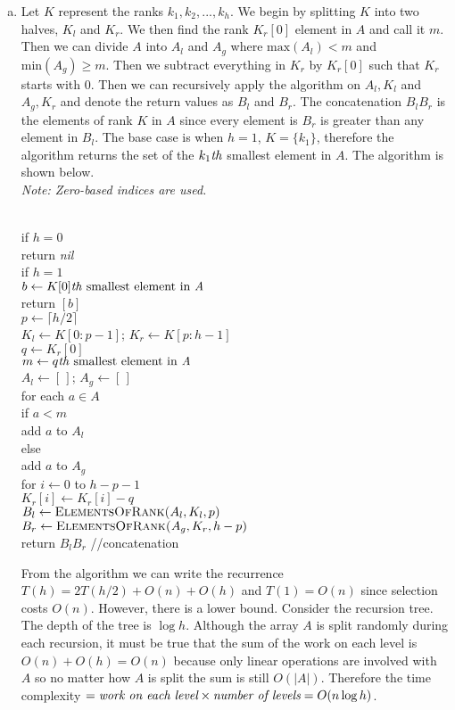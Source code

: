 \documentclass[11pt]{article}
\begin{document}
\begin{solution}
\begin{enumerate}[(a)]
\item
Let $K$ represent the ranks $k_1, k_2, ..., k_h$. We begin by splitting $K$ into two halves, $K_l$ and $K_r$. We then find the rank $K_r[0]$ element in $A$ and call it $m$. Then we can divide $A$ into $A_l$ and $A_g$ where $\text{max}(A_l)<m$ and $\text{min}(A_g)\geq m$. Then we subtract everything in $K_r$ by $K_r[0]$ such that $K_r$ starts with $0$. Then we can recursively apply the algorithm on $A_l, K_l$ and $A_g, K_r$ and denote the return values as $B_l$ and $B_r$. The concatenation $B_lB_r$ is the elements of rank $K$ in $A$ since every element is $B_r$ is greater than any element in $B_l$. The base case is when $h=1$, $K=\{k_1\}$, therefore the algorithm returns the set of the $k_1\text{\emph{th}}$ smallest element in $A$. The algorithm is shown below.\\
\emph{Note: Zero-based indices are used.}
\begin{algo}
	\+
\\	if $h=0$\+
\\	return \emph{nil}\-
\\	if $h=1$\+
\\	$b\gets \text{$K[0]$\emph{th} smallest element in \emph{A}}$
\\	return $[b]$\-
\\	$p\gets \lceil h/2 \rceil$
\\	$K_l\gets K[0:p-1]$; $K_r\gets K[p:h-1]$
\\	$q\gets K_r[0]$
\\	$m\gets \text{$q$\emph{th} smallest element in \emph{A}}$
\\	$A_l\gets [\,]$; $A_g\gets [\,]$
\\	for each $a\in A$\+
\\	if $a<m$\+
\\	add $a$ to $A_l$\-
\\	else\+
\\	add $a$ to $A_g$\-\-
\\	for $i\gets 0$ to $h-p-1$\+
\\	$K_r[i]\gets K_r[i] - q$\-
\\	$B_l\gets \textsc{ElementsOfRank($A_l, K_l, p$)}$
\\	$B_r\gets \textsc{ElementsOfRank($A_g, K_r, h-p$)}$
\\	return $B_lB_r$    //concatenation
\end{algo}
From the algorithm we can write the recurrence $T(h)=2T(h/2)+O(n)+O(h)$ and $T(1)=O(n)$ since selection costs $O(n)$. However, there is a lower bound. Consider the recursion tree. The depth of the tree is $\log{h}$. Although the array $A$ is split randomly during each recursion, it must be true that the sum of the work on each level is $O(n)+O(h)=O(n)$ because only linear operations are involved with $A$ so no matter how $A$ is split the sum is still $O(|A|)$. Therefore the time complexity $=\emph{work on each level}\times \emph{number of levels} = O(n\log{h})$.


\end{enumerate}
\end{solution}
\end{document}
